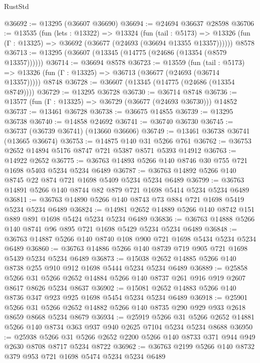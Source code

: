 \begin{lexlean}{RustStd}
\begin{coremodule}
@36692 := @13295 (@36607 @36690)
@36694 := @24694 @36637 @28598
@36706 := @13535
    (fun (lets : @13322) =>
    @13324
      (fun (tail : @5173) =>
      @13326 (fun (Γ : @13325) => @36692 (@36677 (@24693 (@36694 @13355 @13357))))))
    @8578
@36713 := @13295 (@36607 (@13345 (@14775 (@24686 (@13354 (@8579 @13357))))))
@36714 := @36694 @8578
@36723 := @13559
    (fun (tail : @5173) => @13326 (fun (Γ : @13325) => @36713 (@36677 (@24693 (@36714 @13357)))))
    @8748
@36728 := @36607 (@13345 (@14775 (@24686 (@13354 @8749))))
@36729 := @13295 @36728
@36730 := @36714 @8748
@36736 := @13577 (fun (Γ : @13325) => @36729 (@36677 (@24693 @36730))) @14852
@36737 := @13461 @36728
@36738 := @36675 @14855
@36739 := @13295 @36738
@36740 := @14858 @24692
@36741 := @36740 @36730
@36745 := @36737 (@36739 @36741) (@13660 @36606)
@36749 := @13461 @36738 @36741 (@13665 @36674)
@36753 := @14875 @140 @31 @5266 @761
@36762 := @36753 @2652 @14894 @5176 @8747 @721 @5387 @8571 @5393 @14912
@36763 := @14922 @2652
@36775 := @36763 @14893 @5266 @140 @8746 @30 @755 @721 @1698 @5403 @5234 @5234 @6489
@36787 := @36763 @14892 @5266 @140 @8745 @22 @874 @721 @1698 @5409 @5234 @5234 @6489
@36799 := @36763 @14891 @5266 @140 @8744 @82 @879 @721 @1698 @5414 @5234 @5234 @6489
@36811 := @36763 @14890 @5266 @140 @8743 @73 @884 @721 @1698 @5419 @5234 @5234 @6489
@36824 := @14981 @2652 @14889 @5266 @140 @8742 @151 @889 @891 @1698 @5424 @5234 @5234 @6489
@36836 := @36763 @14888 @5266 @140 @8741 @96 @895 @721 @1698 @5429 @5234 @5234 @6489
@36848 := @36763 @14887 @5266 @140 @8740 @108 @900 @721 @1698 @5434 @5234 @5234 @6489
@36860 := @36763 @14886 @5266 @140 @8739 @719 @905 @721 @1698 @5439 @5234 @5234 @6489
@36873 := @15038 @2652 @14885 @5266 @140 @8738 @255 @910 @912 @1698 @5444 @5234 @5234 @6489
@36889 := @25858
    @5266
    @31
    @5266
    @2652
    @14884
    @5266
    @140
    @8737
    @261
    @916
    @919
    @2607
    @8617
    @8626
    @5234
    @8637
@36902 := @15081 @2652 @14883 @5266 @140 @8736 @347 @923 @925 @1698 @5454 @5234 @5234 @6489
@36918 := @25901
    @5266
    @31
    @5266
    @2652
    @14882
    @5266
    @140
    @8735
    @290
    @929
    @933
    @2618
    @8659
    @8668
    @5234
    @8679
@36934 := @25919
    @5266
    @31
    @5266
    @2652
    @14881
    @5266
    @140
    @8734
    @363
    @937
    @940
    @2625
    @7104
    @5234
    @5234
    @8688
@36950 := @25938
    @5266
    @31
    @5266
    @2652
    @2200
    @5266
    @140
    @8733
    @371
    @944
    @949
    @2630
    @8708
    @8717
    @5234
    @8722
@36962 := @36763 @2199 @5266 @140 @8732 @379 @953 @721 @1698 @5474 @5234 @5234 @6489

\end{coremodule}
\end{lexlean}
